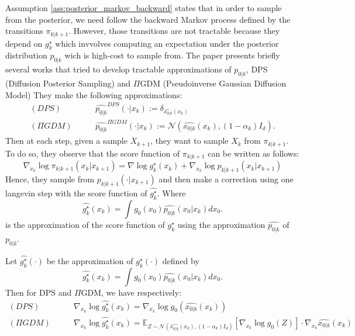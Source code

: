 \documentclass[12pt]{article}
\begin{document}
Assumption \ref{ass:posterior_markov_backward} states that 
in order to sample from the posterior, we need follow the backward 
Markov process defined by the transitions $\pi_{k|k+1}$.
However, those transitions are not tractable because they depend on $g_k^\star$ which 
invvolves computing an expectation under the posterior distribution $p_{0|k}$ wich
is high-cost to sample from.
The paper presents briefly several works that tried to develop tractable approximations 
of $p_{0|k}$, DPS (Diffusion Posterior Sampling) and $\Pi$GDM (Pseudoinverse Gaussian Diffusion Model)
They make the following approximations:
\begin{align*}
    (DPS) \quad \quad  & \hat{p_{0|k}}^{DPS}(\cdot | x_k) := \delta_{\hat{x_{0|k}}(x_k)} \\
    (\Pi GDM) \quad \quad & \hat{p_{0|k}}^{\Pi GDM}(\cdot | x_k) := \mathcal{N}\left( \hat{x_{0|k}}(x_k), (1 - \alpha_k) I_d \right).
\end{align*}
Then at each step, given a sample $X_{k+1}$, they want to sample $X_k$ from $\pi_{k|k+1}$. 
To do so, they observe that the score function of $\pi_{k|k+1}$ can be written as follows:
\begin{equation}
\nabla_{x_k} \log\pi_{k|k+1}(x_k | x_{k+1})
= \nabla \log g_k^\star(x_k) + \nabla_{x_k} \log p_{k|k+1}(x_k | x_{k+1})
\end{equation}
Hence, they sample from $p_{k|k+1}(\cdot | x_{k+1})$ and then make a correction 
using one langevin step with the score function of $\hat{g_k^\star}$. Where
$$\hat{g_k^\star}(x_k) = \int g_0(x_0) \hat{p_{0|k}}(x_0 | x_k) dx_0.$$ is the approximation
of the score function of $g_k^\star$ using the approximation $\hat{p_{0|k}}$ of $p_{0|k}$.

\begin{assumption}
    Let $\hat{g_k^\star}(\cdot)$ be the approximation of $g_k^\star(\cdot)$ defined by
    $$\hat{g_k^\star}(x_k) = \int g_0(x_0) \hat{p_{0|k}}(x_0 | x_k) dx_0.$$
    Then for DPS and $\Pi$GDM, we have respectively:
    \begin{align*}
        (DPS) \quad \quad  & \nabla_{x_k} \log \hat{g_k^\star}(x_k) 
        = \nabla_{x_k} \log g_0(\hat{x_{0|k}}(x_k))\\
        (\Pi GDM) \quad \quad & \nabla_{x_k} \log \hat{g_k^\star}(x_k) 
        = \mathbb{E}_{Z \sim \mathcal{N}( \hat{x_{0|k}}(x_k), (1 - \alpha_k) I_d)} 
        \left[ \nabla_{x_k} \log g_0(Z) \right] \cdot \nabla_{x_k} \hat{x_{0|k}}(x_k)
    \end{align*}
\end{assumption}
\end{document}
